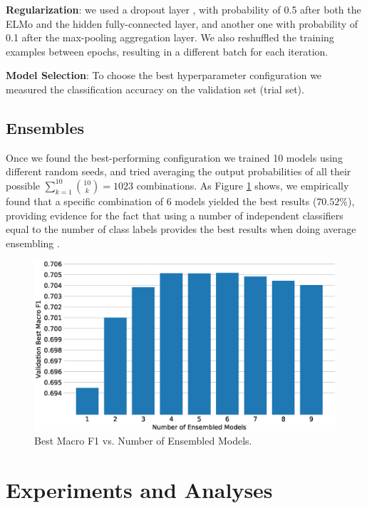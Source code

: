 \documentclass[11pt,a4paper]{article}
\begin{document}
\textbf{Regularization}: we used a dropout layer \cite{srivastava2014dropout}, with probability of 0.5 after both the ELMo and the hidden fully-connected layer, and another one with probability of 0.1 after the max-pooling aggregation layer. We also reshuffled the training examples between epochs, resulting in a different batch for each iteration. 

\textbf{Model Selection}: To choose the best hyperparameter configuration we measured the classification accuracy on the validation set (trial set). 


\subsection{Ensembles}
 
Once we found the best-performing configuration we trained 10 models using different random seeds, and tried averaging the output probabilities of all their possible $\sum_{k=1}^{10}{\binom{10}{k}}=1023$ combinations. As Figure \ref{fig:best_ensembles} shows, we empirically found that a specific combination of $6$ models yielded the best results ($70.52\%$), providing evidence for the fact that using a number of independent classifiers equal to the number of class labels provides the best results when doing average ensembling \cite{bonab2016theoretical}.


\begin{figure}[!h]
    \centering
    \includegraphics[width=\columnwidth]{images/best_ensembles.eps}
\caption{Best Macro F1 vs. Number of Ensembled Models.}
\label{fig:best_ensembles}
\end{figure}

\section{Experiments and Analyses}
\end{document}
